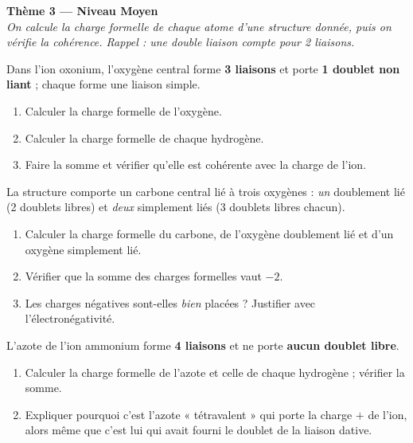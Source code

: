 \documentclass[11pt,a4paper]{article}
\begin{document}
\begin{center}
{\Large\bfseries\color{primarydark}Thème 3 — Niveau Moyen}\\[2pt]
{\small\itshape On calcule la charge formelle de chaque atome d'une structure \emph{donnée}, puis
on vérifie la cohérence. Rappel : une double liaison compte pour 2 liaisons.}
\end{center}
\medskip

\begin{exo}
Dans l'ion oxonium, l'oxygène central forme \textbf{3 liaisons } et porte \textbf{1 doublet
non liant} ; chaque  forme une liaison simple.
\begin{enumerate}[label=\alph*),leftmargin=2em,itemsep=1pt]
  \item Calculer la charge formelle de l'oxygène.
  \item Calculer la charge formelle de chaque hydrogène.
  \item Faire la somme et vérifier qu'elle est cohérente avec la charge de l'ion.
\end{enumerate}
\end{exo}

\begin{exo}
La structure comporte un carbone central lié à trois oxygènes : \emph{un}  doublement lié
(2 doublets libres) et \emph{deux}  simplement liés (3 doublets libres chacun).
\begin{enumerate}[label=\alph*),leftmargin=2em,itemsep=1pt]
  \item Calculer la charge formelle du carbone, de l'oxygène doublement lié et d'un oxygène simplement lié.
  \item Vérifier que la somme des charges formelles vaut $-2$.
  \item Les charges négatives sont-elles \emph{bien} placées ? Justifier avec l'électronégativité.
\end{enumerate}
\end{exo}

\begin{exo}
L'azote de l'ion ammonium forme \textbf{4 liaisons } et ne porte \textbf{aucun doublet libre}.
\begin{enumerate}[label=\alph*),leftmargin=2em,itemsep=1pt]
  \item Calculer la charge formelle de l'azote et celle de chaque hydrogène ; vérifier la somme.
  \item Expliquer pourquoi c'est l'azote « tétravalent » qui porte la charge $+$ de l'ion, alors
        même que c'est lui qui avait fourni le doublet de la liaison dative.
\end{enumerate}
\end{exo}
\end{document}
